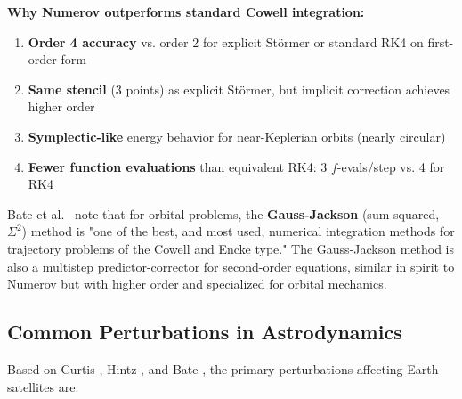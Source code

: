 \documentclass[11pt]{article}
\begin{document}
\textbf{Why Numerov outperforms standard Cowell integration:}
\begin{enumerate}
\item \textbf{Order 4 accuracy} vs. order 2 for explicit Störmer or standard RK4 on first-order form
\item \textbf{Same stencil} (3 points) as explicit Störmer, but implicit correction achieves higher order
\item \textbf{Symplectic-like} energy behavior for near-Keplerian orbits (nearly circular)
\item \textbf{Fewer function evaluations} than equivalent RK4: 3 $f$-evals/step vs. 4 for RK4
\end{enumerate}

Bate et al.\ \cite{Bate1971} note that for orbital problems, the \textbf{Gauss-Jackson} (sum-squared, $\Sigma^2$) method is "one of the best, and most used, numerical integration methods for trajectory problems of the Cowell and Encke type." The Gauss-Jackson method is also a multistep predictor-corrector for second-order equations, similar in spirit to Numerov but with higher order and specialized for orbital mechanics.

\subsection{Common Perturbations in Astrodynamics}
\label{ssec:perturbations}

Based on Curtis \cite{Curtis2005}, Hintz \cite{Hintz2015}, and Bate \cite{Bate1971}, the primary perturbations affecting Earth satellites are:
\end{document}
